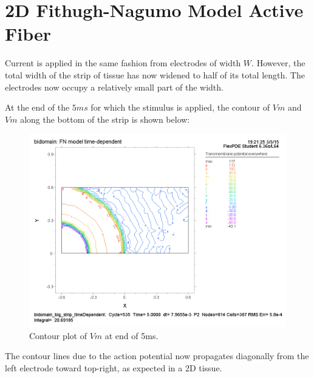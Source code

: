 \documentclass{article}
\begin{document}
\section{2D Fithugh-Nagumo Model Active Fiber}
Current is applied in the same fashion from electrodes of width $W$. However, the total width of the strip of tissue has now widened to half of its total length. The electrodes now occupy a relatively small part of the width.

At the end of the $5ms$ for which the stimulus is applied, the contour of $Vm$ and $Vm$ along the bottom of the strip is shown below:

\begin{figure}[H]
    \begin{center}
        \includegraphics[scale=0.5]{2Dstrip_contourVm_t=5ms.png}
        \caption{Contour plot of $Vm$ at end of 5ms.}
    \end{center}
\end{figure}

The contour lines due to the action potential now propagates diagonally from the left electrode toward top-right, as expected in a 2D tissue.
\end{document}
